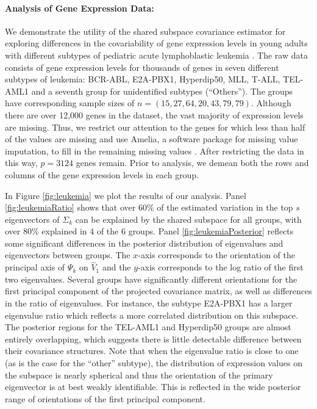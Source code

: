 \documentclass[12pt]{article}
\begin{document}
\paragraph{Analysis of Gene Expression Data:}

We demonstrate the utility of the shared subspace covariance
estimator for exploring differences in the covariability of gene
expression levels in young adults with different subtypes of pediatric
acute lymphoblastic leukemia \citep{Yeoh2002}.  The raw data consists
of gene expression levels for thousands of genes in seven different
subtypes of leukemia: BCR-ABL, E2A-PBX1, Hyperdip50, MLL, T-ALL,
TEL-AML1 and a seventh group for unidentified subtypes (``Others'').  The groups
have corresponding sample sizes of $n = (15, 27, 64, 20, 43, 79, 79)$.
Although there are over 12,000 genes in the dataset, the vast majority of expression
levels are missing.  Thus, we restrict our attention to the genes for
which less than half of the values are missing and use Amelia, a
software package for missing value imputation, to fill in the
remaining missing values \citep{Amelia}.  After restricting the data
in this way, $p=3124$ genes remain.  Prior to analysis, we demean both
the rows and columns of the gene expression levels in each group.

In Figure \ref{fig:leukemia} we plot the results of our analysis.
Panel \ref{fig:leukemiaRatio} shows that over $60\%$ of the estimated
variation in the top $s$ eigenvectors of $\Sigma_k$ can be explained
by the shared subspace for all groups, with over 80\% explained in 4
of the 6 groups.  Panel \ref{fig:leukemiaPosterior} reflects some
significant differences in the posterior distribution of eigenvalues
and eigenvectors between groups.  The $x$-axis corresponds to the
orientation of the principal axis of $\Psi_k$ on $\hat{V}_1$ and the
$y$-axis corresponds to the log ratio of the first two eigenvalues.
Several groups have significantly different orientations for the first
principal component of the projected covariance matrix, as well as
differences in the ratio of eigenvalues.  For instance, the subtype
E2A-PBX1 has a larger eigenvalue ratio which reflects a more
correlated distribution on this subspace.  The posterior regions for
the TEL-AML1 and Hyperdip50 groups are almost entirely overlapping,
which suggests there is little detectable difference between their
covariance structures.  Note that when the eigenvalue ratio is close
to one (as is the case for the ``other'' subtype), the distribution of
expression values on the subspace is nearly spherical and thus the
orientation of the primary eigenvector is at best weakly identifiable.
This is reflected in the wide posterior range of orientations of the
first principal component.
\end{document}
